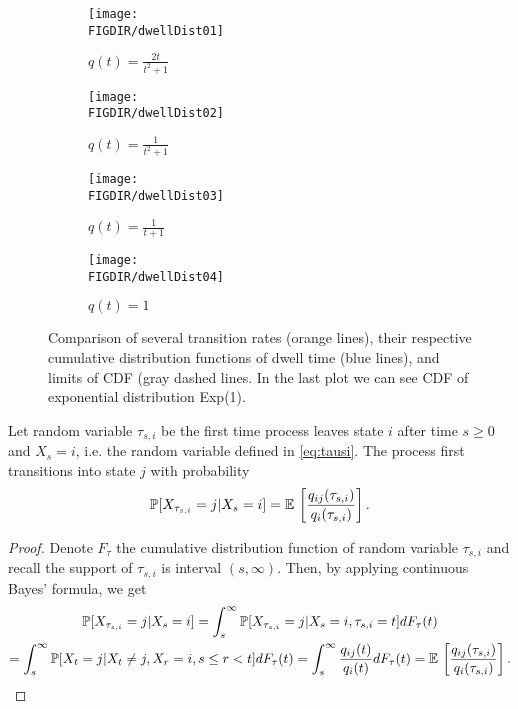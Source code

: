{\begin{figure}
	\centering
	
	\begin{subfigure}[b]{0.46\textwidth}
    \centering
		\texttt{[image: \\FIGDIR/dwellDist01]}
    \caption{$q(t) = \frac{2t}{t^2 + 1}$}
  \end{subfigure}
	\hfill
	\begin{subfigure}[b]{0.46\textwidth}
    \centering
		\texttt{[image: \\FIGDIR/dwellDist02]}
    \caption{$q(t) = \frac{1}{t^2 + 1}$}
  \end{subfigure}

	\begin{subfigure}[b]{0.46\textwidth}
    \centering
		\texttt{[image: \\FIGDIR/dwellDist03]}
    \caption{$q(t) = \frac{1}{t + 1}$}
  \end{subfigure}
	\hfill
	\begin{subfigure}[b]{0.46\textwidth}
    \centering
		\texttt{[image: \\FIGDIR/dwellDist04]}
    \caption{$q(t) = 1$}
  \end{subfigure}

	\caption{Comparison of several transition rates (orange lines), their respective cumulative distribution functions of dwell time (blue lines), and limits of CDF (gray dashed lines. In the last plot we can see CDF of exponential distribution Exp(1).}
	\label{fig:dwellDist}
\end{figure}


\begin{proposition}
	Let random variable $\tau_{s,i}$ be the first time process leaves state $i$ after time $s \geq 0$ and $X_s = i$, i.e. the random variable defined in \eqref{eq:tausi}. The process first transitions into state $j$ with probability
	\begin{equation}
		\label{eq:transProb}
		\operatorname{\mathbb{P}} [X_{\tau_{s,i}} = j \vert X_s = i ] = \operatorname{\mathbb{E}\,} \left[ \frac{q_{ij}(\tau_{s,i})}{q_i(\tau_{s,i})} \right].
	\end{equation}
\end{proposition}

\begin{proof}
	Denote $F_{\tau}$ the cumulative distribution function of random variable $\tau_{s,i}$ and recall the support of $\tau_{s,i}$ is interval $(s, \infty)$. Then, by applying continuous Bayes' formula, we get
	\begin{multline*}
		\operatorname{\mathbb{P}} [X_{\tau_{s,i}} = j \vert X_s = i ] 
		= \int_s^\infty \operatorname{\mathbb{P}} [X_{\tau_{s,i}} = j \vert X_s = i, \tau_{s,i} = t] dF_{\tau} (t) \\
		= \int_s^\infty \operatorname{\mathbb{P}} [X_{t} = j \vert X_{t} \neq j, X_r = i, s \leq r < t] dF_{\tau} (t)
		= \int_s^\infty \frac{q_{ij}(t)}{q_{i}(t)} dF_{\tau} (t)
		= \operatorname{\mathbb{E}\,} \left[ \frac{q_{ij}(\tau_{s,i})}{q_i(\tau_{s,i})} \right].
	\end{multline*}
\end{proof}

}
